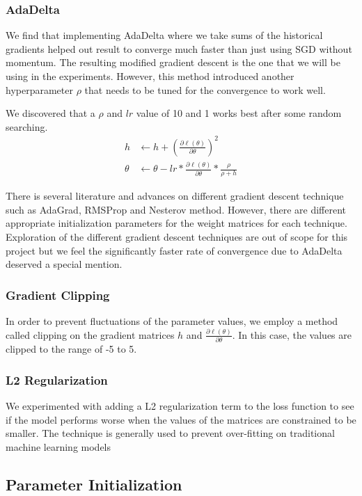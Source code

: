 \documentclass[fyp]{socreport}
\begin{document}
\subsubsection{AdaDelta} We find that implementing AdaDelta where we take sums
of the historical gradients helped out result to converge much faster than just
using SGD without momentum. The resulting modified gradient descent is the one
that we will be using in the experiments. However, this method introduced another
hyperparameter $\rho$ that needs to be tuned for the convergence to work well.

We discovered that a $\rho$ and $lr$ value of 10 and 1 works best after some
random searching.
\begin{align*}
  h &\leftarrow h + \left( \frac{\partial \ell(\theta)}{\partial \theta} \right)^2 \\
  \theta &\leftarrow \theta - lr * \frac{\partial \ell(\theta)}{\partial \theta}
  * \frac{\rho}{\rho + h}
\end{align*}

There is several literature and advances on different gradient descent
technique such as AdaGrad, RMSProp and Nesterov method.  However, there are
different appropriate initialization parameters for the weight matrices for
each technique.  Exploration of the different gradient descent techniques
are out of scope for this project but we feel the significantly faster rate of
convergence due to AdaDelta deserved a special mention.

\subsubsection{Gradient Clipping} In order to prevent fluctuations of the parameter
values, we employ a method called clipping on the gradient matrices $h$ and
$\frac{\partial \ell(\theta)}{\partial \theta}$. In this case, the values are
clipped to the range of -5 to 5.

\subsubsection{L2 Regularization} We experimented with adding a L2
regularization term to the loss function to see if the model performs worse
when the values of the matrices are constrained to be smaller. The technique
is generally used to prevent over-fitting on traditional machine learning
models

\subsection{Parameter Initialization}
\end{document}
